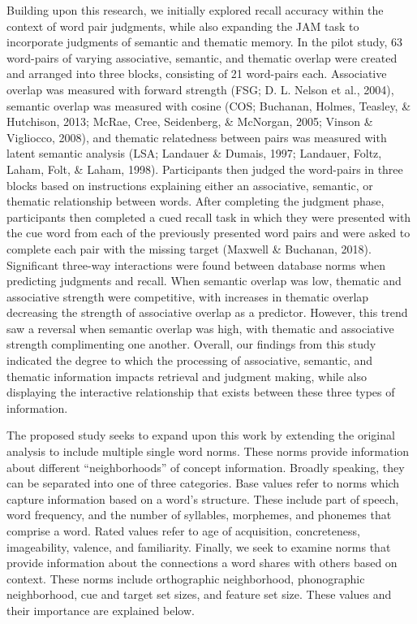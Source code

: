 \documentclass[english,man]{apa6}
\theoremstyle{definition}
\theoremstyle{definition}
\theoremstyle{definition}
\theoremstyle{remark}
\begin{document}
Building upon this research, we initially explored recall accuracy
within the context of word pair judgments, while also expanding the JAM
task to incorporate judgments of semantic and thematic memory. In the
pilot study, 63 word-pairs of varying associative, semantic, and
thematic overlap were created and arranged into three blocks, consisting
of 21 word-pairs each. Associative overlap was measured with forward
strength (FSG; D. L. Nelson et al., 2004), semantic overlap was measured
with cosine (COS; Buchanan, Holmes, Teasley, \& Hutchison, 2013; McRae,
Cree, Seidenberg, \& McNorgan, 2005; Vinson \& Vigliocco, 2008), and
thematic relatedness between pairs was measured with latent semantic
analysis (LSA; Landauer \& Dumais, 1997; Landauer, Foltz, Laham, Folt,
\& Laham, 1998). Participants then judged the word-pairs in three blocks
based on instructions explaining either an associative, semantic, or
thematic relationship between words. After completing the judgment
phase, participants then completed a cued recall task in which they were
presented with the cue word from each of the previously presented word
pairs and were asked to complete each pair with the missing target
(Maxwell \& Buchanan, 2018). Significant three-way interactions were
found between database norms when predicting judgments and recall. When
semantic overlap was low, thematic and associative strength were
competitive, with increases in thematic overlap decreasing the strength
of associative overlap as a predictor. However, this trend saw a
reversal when semantic overlap was high, with thematic and associative
strength complimenting one another. Overall, our findings from this
study indicated the degree to which the processing of associative,
semantic, and thematic information impacts retrieval and judgment
making, while also displaying the interactive relationship that exists
between these three types of information.

The proposed study seeks to expand upon this work by extending the
original analysis to include multiple single word norms. These norms
provide information about different \enquote{neighborhoods} of concept
information. Broadly speaking, they can be separated into one of three
categories. Base values refer to norms which capture information based
on a word's structure. These include part of speech, word frequency, and
the number of syllables, morphemes, and phonemes that comprise a word.
Rated values refer to age of acquisition, concreteness, imageability,
valence, and familiarity. Finally, we seek to examine norms that provide
information about the connections a word shares with others based on
context. These norms include orthographic neighborhood, phonographic
neighborhood, cue and target set sizes, and feature set size. These
values and their importance are explained below.
\end{document}

